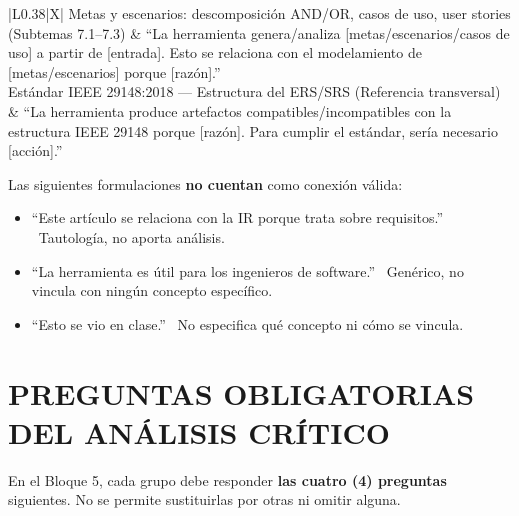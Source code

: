\documentclass[11pt,a4paper]{article}
\begin{document}
\begin{tabularx}{\linewidth}{|L{0.38\linewidth}|X|}
		\hline
		\small Metas y escenarios: descomposición AND/OR, casos de uso, user stories (Subtemas 7.1--7.3) & \small ``La herramienta genera/analiza [metas/escenarios/casos de uso] a partir de [entrada]. Esto se relaciona con el modelamiento de [metas/escenarios] porque [razón].''\\
		\hline
		\small Estándar IEEE 29148:2018 — Estructura del ERS/SRS (Referencia transversal) & \small ``La herramienta produce artefactos compatibles/incompatibles con la estructura IEEE 29148 porque [razón]. Para cumplir el estándar, sería necesario [acción].''\\
		\hline
	\end{tabularx}
	
	\begin{alertbox}
		Las siguientes formulaciones \textbf{no cuentan} como conexión válida:
		\begin{itemize}[leftmargin=14pt, itemsep=2pt]
			\item ``Este artículo se relaciona con la IR porque trata sobre requisitos.'' \textrightarrow\ Tautología, no aporta análisis.
			\item ``La herramienta es útil para los ingenieros de software.'' \textrightarrow\ Genérico, no vincula con ningún concepto específico.
			\item ``Esto se vio en clase.'' \textrightarrow\ No especifica qué concepto ni cómo se vincula.
		\end{itemize}
	\end{alertbox}
	
	\section{PREGUNTAS OBLIGATORIAS DEL ANÁLISIS CRÍTICO}\label{sec:critico}
	
	En el Bloque 5, cada grupo debe responder \textbf{las cuatro (4) preguntas} siguientes. No se permite sustituirlas por otras ni omitir alguna.
	
\end{document}
